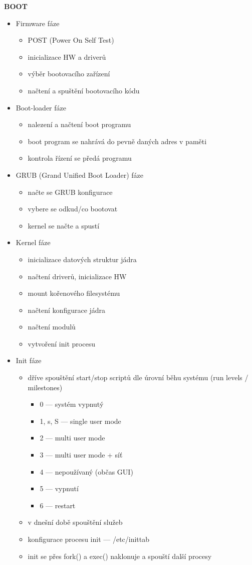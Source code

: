 \textbf{BOOT}
\begin{itemize}
	\item Firmware fáze
	\begin{itemize}
		\item POST (Power On Self Test)
		\item inicializace HW a driverů
		\item výběr bootovacího zařízení
		\item načtení a spuštění bootovacího kódu
	\end{itemize}
	\item Boot-loader fáze
	\begin{itemize}
		\item nalezení a načtení boot programu
		\item boot program se nahrává do pevně daných adres v paměti
		\item kontrola řízení se předá programu
	\end{itemize}
	\item GRUB (Grand Unified Boot Loader) fáze
	\begin{itemize}
		\item načte se GRUB konfigurace
		\item vybere se odkud/co bootovat
		\item kernel se načte a spustí
	\end{itemize}
	\item Kernel fáze
	\begin{itemize}
		\item inicializace datových struktur jádra
		\item načtení driverů, inicializace HW
		\item mount kořenového filesystému
		\item načtení konfigurace jádra
		\item načtení modulů
		\item vytvoření init procesu
	\end{itemize}
	
	\newpage
	\item Init fáze
	\begin{itemize}
		\item dříve spouštění start/stop scriptů dle úrovní běhu systému (run levels / milestones)
		\begin{itemize}
			\item 0 --- systém vypnutý
			\item 1, s, S --- single user mode
			\item 2 --- multi user mode
			\item 3 --- multi user mode + síť
			\item 4 --- nepoužívaný (občas GUI)
			\item 5 --- vypnutí
			\item 6 --- restart
		\end{itemize}
		\item v dnešní době spouštění služeb
		\item konfigurace procesu init --- /etc/inittab
		\item init se přes fork() a exec() naklonuje a spouští další procesy
	\end{itemize}
\end{itemize}

